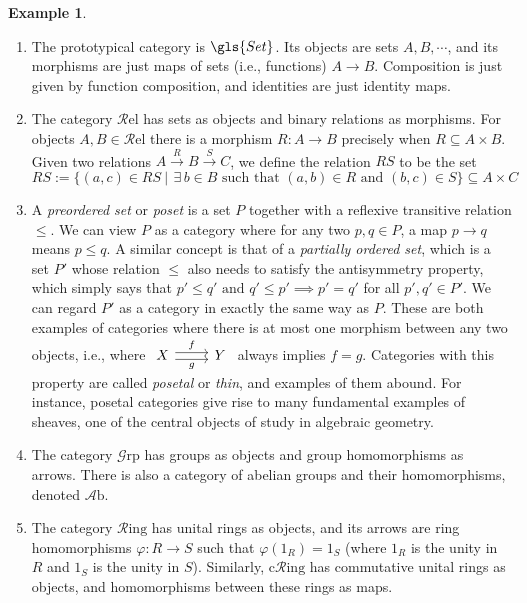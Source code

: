 \documentclass[10pt,oneside]{book}
\def\~#1{\mathscr{#1}}
\def\To#1{\xrightarrow{#1}}
\newcommand{\Rel}{\~R\mathrm{el}}
\newcommand{\Grp}{\~G\mathrm{rp}}
\newcommand{\Ab}{\~A\mathrm{b}}
\newcommand{\Ring}{\~R\mathrm{ing}}
\newcommand{\cRing}{\mathrm{c}\~{R}\mathrm{ing}}
\newcommand{\vp}{\varphi}
\theoremstyle{plain}
\theoremstyle{definition}
\newtheorem{ex}[thm]{Example}
\theoremstyle{remark}
\numberwithin{equation}{section}
\numberwithin{figure}{section}
\begin{document}
\begin{ex}
\begin{enumerate}[label=(\roman*)]
        \item The prototypical category is $\gls{Set}$. Its objects are sets $A, B, \cdots$, and its morphisms are just maps of sets (i.e., functions) $A \to B$. Composition is just given by function composition, and identities are just identity maps. 
        
        \item The category $\Rel$ has sets as objects and binary relations as morphisms. For objects $A, B \in \Rel$ there is a morphism $R: A \to B$ precisely when $R \subseteq A \times B$. Given two relations $A \To{R} B \To{S} C$, we define the relation $RS$ to be the set
        \[RS := \{(a, c) \in RS ~|~ \, \exists \, b \in B \text{ such that } (a, b) \in R \text{ and } (b, c) \in S \} \subseteq A \times C\]

        \item A \emph{preordered set} or \emph{poset} is a set $P$ together with a reflexive transitive relation $\leq$. We can view $P$ as a category where for any two $p, q \in P$, a map $p \to q$ means $p \leq q$. A similar concept is that of a \emph{partially ordered set}, which is a set $P'$ whose relation $\leq$ also needs to satisfy the antisymmetry property, which simply says that $p' \leq q' \text{ and } q' \leq p' \implies p' = q'$ for all $p', q' \in P'$. We can regard $P'$ as a category in exactly the same way as $P$. These are both examples of categories where there is at most one morphism between any two objects, i.e., where $\begin{tikzcd}
    X & Y
    \arrow["g"', shift right, from=1-1, to=1-2]
    \arrow["f", shift left, from=1-1, to=1-2]
\end{tikzcd}$ always implies  $f = g$. Categories with this property are called \emph{posetal} or \emph{thin}, and examples of them abound. For instance, posetal categories give rise to many fundamental examples of sheaves, one of the central objects of study in algebraic geometry. 
        
        \item The category $\Grp$ has groups as objects and group homomorphisms as arrows. There is also a category of abelian groups and their homomorphisms, denoted $\Ab$.
        
        \item The category $\Ring$ has unital rings as objects, and its arrows are ring homomorphisms $\vp: R \to S$ such that $\vp(1_R) = 1_S$ (where $1_R$ is the unity in $R$ and $1_S$ is the unity in $S$). Similarly, $\cRing$ has commutative unital rings as objects, and homomorphisms between these rings as maps. %
        

\end{enumerate}
\end{ex}
\end{document}
